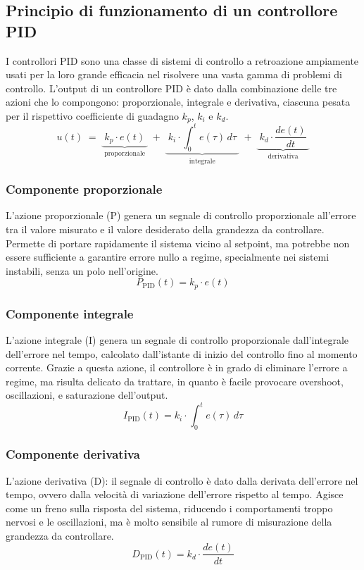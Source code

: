 \subsection{Principio di funzionamento di un controllore PID}
I controllori PID sono una classe di sistemi di controllo a retroazione ampiamente usati per la loro grande efficacia
nel risolvere una vasta gamma di problemi di controllo. L'output di un controllore PID è dato dalla combinazione delle
tre azioni che lo compongono: proporzionale, integrale e derivativa, ciascuna pesata per il rispettivo coefficiente di
guadagno \(k_p\), \(k_i\) e \(k_d\).
\begin{equation}
	u(t) \; = \; \underbrace{ \; k_p \cdot e(t) \;}_\text{proporzionale} \; + \; \underbrace{\; k_i \cdot \int_0^t \! e(\tau) \, d\tau \;}_\text{integrale} \; + \; \underbrace{\; k_d \cdot \frac{de(t)}{dt} \;}_\text{derivativa}
	\label{eq:pid_output}
\end{equation}

\subsubsection{Componente proporzionale}
L'azione proporzionale (P) genera un segnale di controllo proporzionale all'errore tra il valore misurato e il valore
desiderato della grandezza da controllare. Permette di portare rapidamente il sistema vicino al setpoint, ma potrebbe
non essere sufficiente a garantire errore nullo a regime, specialmente nei sistemi instabili, senza un polo nell'origine.
\begin{equation}
	P_\text{PID}(t) = k_p \cdot e(t)
	\label{eq:pid_prop}
\end{equation}

\subsubsection{Componente integrale}
L'azione integrale (I) genera un segnale di controllo proporzionale dall'integrale dell'errore nel tempo, calcolato
dall'istante di inizio del controllo fino al momento corrente. Grazie a questa azione, il controllore è in grado di
eliminare l'errore a regime, ma risulta delicato da trattare, in quanto è facile provocare overshoot, oscillazioni,
e saturazione dell'output.
\begin{equation}
	I_\text{PID}(t) = k_i \cdot \int_{0}^{t} e(\tau) \, d\tau
	\label{eq:pid_int}
\end{equation}

\subsubsection{Componente derivativa}
L'azione derivativa (D): il segnale di controllo è dato dalla derivata dell'errore nel tempo, ovvero dalla velocità
di variazione dell'errore rispetto al tempo. Agisce come un freno sulla risposta del sistema, riducendo i comportamenti
troppo nervosi e le oscillazioni, ma è molto sensibile al rumore di misurazione della grandezza da controllare.
\begin{equation}
	D_\text{PID}(t) = k_d \cdot \frac{de(t)}{dt}
	\label{eq:pid_der}
\end{equation}

